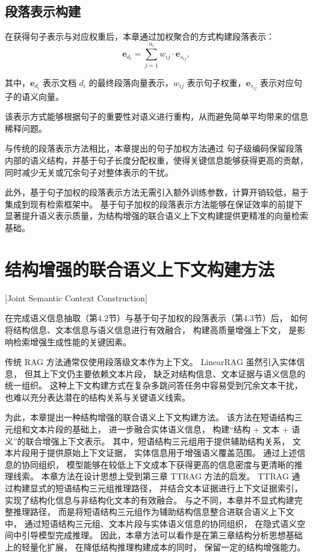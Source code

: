 \subsection{段落表示构建}

在获得句子表示与对应权重后，本章通过加权聚合的方式构建段落表示：
\begin{equation}
\mathbf{e}_{d_i} = \sum_{j=1}^{n_i} w_{ij} \cdot \mathbf{e}_{s_{ij}},
\end{equation}

\noindent 其中，$\mathbf{e}_{d_i}$ 表示文档 $d_i$ 的最终段落向量表示，$w_{ij}$ 表示句子权重，$\mathbf{e}_{s_{ij}}$ 表示对应句子的语义向量。

该表示方式能够根据句子的重要性对语义进行重构，从而避免简单平均带来的信息稀释问题。

与传统的段落表示方法相比，本章提出的句子加权方法通过
句子级编码保留段落内部的语义结构，并基于句子长度分配权重，使得关键信息能够获得更高的贡献，同时减少无关或冗余句子对整体表示的干扰。

此外，基于句子加权的段落表示方法无需引入额外训练参数，计算开销较低，易于集成到现有检索框架中。
基于句子加权的段落表示方法能够在保证效率的前提下显著提升语义表示质量，为结构增强的联合语义上下文构建提供更精准的向量检索基础。

\section{结构增强的联合语义上下文构建方法}[Joint Semantic Context Construction]

在完成语义信息抽取（第4.2节）与基于句子加权的段落表示（第4.3节）后，
如何将结构信息、文本信息与语义信息进行有效融合，
构建高质量增强上下文，
是影响检索增强生成性能的关键因素。

传统 RAG 方法通常仅使用段落级文本作为上下文。
LinearRAG 虽然引入实体信息，
但其上下文仍主要依赖文本片段，
缺乏对结构信息、文本证据与语义信息的统一组织。
这种上下文构建方式在复杂多跳问答任务中容易受到冗余文本干扰，
也难以充分表达潜在的结构关系与关键语义线索。

为此，本章提出一种结构增强的联合语义上下文构建方法。
该方法在短语结构三元组和文本片段的基础上，
进一步融合实体语义信息，
构建“结构 + 文本 + 语义”的联合增强上下文表示。
其中，短语结构三元组用于提供辅助结构关系，
文本片段用于提供原始上下文证据，
实体信息用于增强语义覆盖范围。
通过上述信息的协同组织，
模型能够在较低上下文成本下获得更高的信息密度与更清晰的推理线索。
本章方法在设计思想上受到第三章 TTRAG 方法的启发。
TTRAG 通过构建显式的短语结构三元组推理路径，
并结合文本证据进行上下文证据索引，
实现了结构化信息与非结构化文本的有效融合。
与之不同，本章并不显式构建完整推理路径，
而是将短语结构三元组作为辅助结构信息整合进联合语义上下文中，
通过短语结构三元组、文本片段与实体语义信息的协同组织，
在隐式语义空间中引导模型完成推理。
因此，本章方法可以看作是在第三章结构分析思想基础上的轻量化扩展，
在降低结构推理构建成本的同时，
保留一定的结构增强能力。

